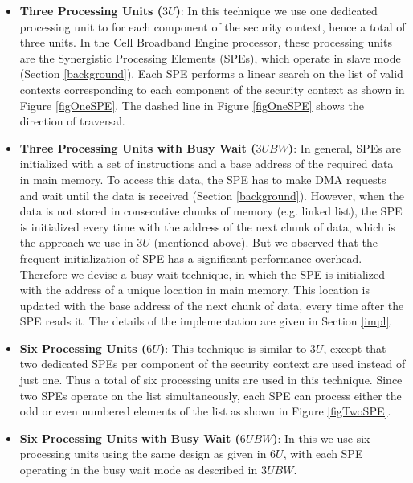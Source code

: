 \documentclass[conference]{IEEEtran}
\newcommand{\eat}[1]{}
\begin{document}
\begin{itemize}

\item \textbf{Three Processing Units ($3U$)}: In this technique we use
  one dedicated processing unit to for each component of the security
  context, hence a total of three units. In the Cell Broadband Engine
  processor, these processing units are the Synergistic Processing
  Elements (SPEs), which operate in slave mode (Section
  \ref{background}). Each SPE performs a linear search on the list of
  valid contexts corresponding to each component of the security
  context as shown in Figure \ref{figOneSPE}. The dashed line in
  Figure \ref{figOneSPE} shows the direction of traversal.

\item \textbf{Three Processing Units with Busy Wait ($3UBW$)}: In
  general, SPEs are initialized with a set of instructions and a base
  address of the required data in main memory. To access this data,
  the SPE has to make DMA requests and wait until the data is received
  (Section \ref{background}). However, when the data is not stored in
  consecutive chunks of memory (e.g. linked list), the SPE is
  initialized every time with the address of the next chunk of data,
  which is the approach we use in $3U$ (mentioned above). But we
  observed that the frequent initialization of SPE has a significant
  performance overhead. Therefore we devise a busy wait technique, in
  which the SPE is initialized with the address of a unique location
  in main memory\eat{ instead of the base address of the data}. This
  location is updated with the base address of the next chunk of data,
  every time after the SPE reads it. The details of the implementation
  are given in Section \ref{impl}.

\item \textbf{Six Processing Units ($6U$)}: This technique is similar
  to $3U$, except that two dedicated SPEs per component of the
  security context are used instead of just one. Thus a total of six
  processing units are used in this technique. Since two SPEs operate
  on the list simultaneously, each SPE can process either the odd or
  even numbered elements of the list as shown in Figure
  \ref{figTwoSPE}.

\item \textbf{Six Processing Units with Busy Wait ($6UBW$)}: In this
  we use six processing units using the same design as given in $6U$,
  with each SPE operating in the busy wait mode as described in
  $3UBW$.

\end{itemize}
\end{document}
